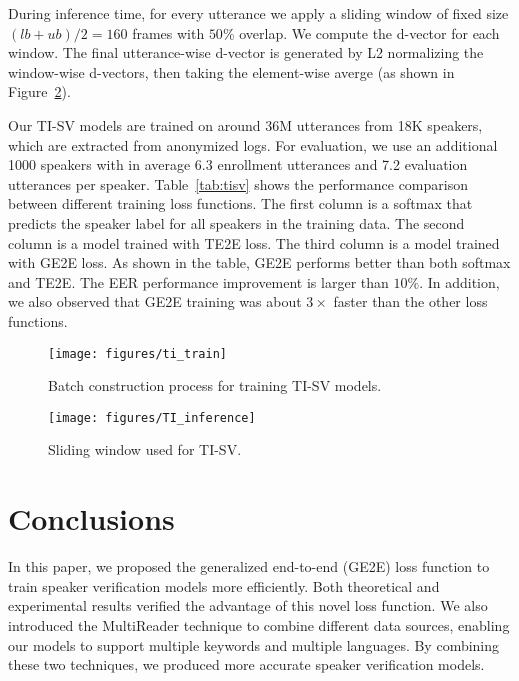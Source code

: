 \documentclass{article}
\begin{document}
During inference time, for every utterance we apply a sliding window of fixed size
$(lb + ub)/2=160$ frames with $50\%$ overlap. We compute the d-vector for each window.
The final utterance-wise d-vector is generated by L2 normalizing the window-wise d-vectors,
then taking the element-wise averge (as shown in Figure~\ref{fig:TI_inference}).

Our TI-SV models are trained on around 36M utterances from 18K speakers, which are extracted from anonymized logs. For evaluation, we use an additional 1000 speakers with in average 6.3 enrollment utterances and 7.2 evaluation utterances per speaker.
Table~\ref{tab:tisv} shows the performance comparison between different training
loss functions.
The first column is a softmax that predicts the speaker label for all speakers in the training data.
The second column is a model trained with TE2E loss.
The third column is a model trained with GE2E loss.
As shown in the table, GE2E performs better than both softmax and TE2E.
The EER performance improvement is larger than  $10\%$.
In addition, we also observed
that GE2E training was about $3\times$ faster than the other loss functions.

\begin{figure}[t]
  \centering
    \texttt{[image: figures/ti\_train]}
  \caption{Batch construction process for training TI-SV models.}
  \label{fig:TI_train}
\end{figure}
\begin{figure}[t]
  \centering
    \texttt{[image: figures/TI\_inference]}
  \caption{Sliding window used for TI-SV.}
  \label{fig:TI_inference}
\end{figure}

\begin{table}[th]
  \caption{
    Text-independent speaker verification EER (\%).
  }
  \label{tab:tisv}
  \begin{center}
  \end{center}
\end{table}


\section{Conclusions}
\label{sec:conclusions}
In this paper, we proposed the generalized end-to-end (GE2E) loss function to train
speaker verification models more efficiently. Both theoretical and experimental results
verified the advantage of this novel loss function.
We also introduced the MultiReader technique to combine different data sources, enabling
our models to support multiple keywords and multiple languages. By combining
these two techniques, we produced more accurate speaker verification models.




\newpage


\end{document}
